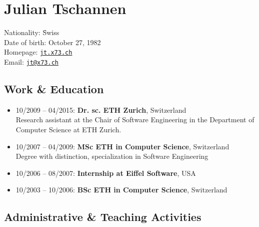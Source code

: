 \chapter*{Julian Tschannen}
\pagestyle{empty}

\vspace{-1cm}

\begin{tabbing}
Nationality: \hspace{1mm} \= Swiss \\
Date of birth: \> October 27, 1982 \\
Homepage:      \> \href{http://jt.x73.ch}{\texttt{jt.x73.ch}} \\
Email:         \> \href{mailto:jt@x73.ch}{\texttt{jt@x73.ch}} \\
\end{tabbing}


\section*{Work \& Education}

\begin{itemize}
  \item
  10/2009 -- 04/2015: \textbf{Dr. sc. ETH Zurich}, Switzerland\\
  Research assistant at the Chair of Software Engineering in the Department of Computer Science at ETH Zurich.

  \item
  10/2007 -- 04/2009: \textbf{MSc ETH in Computer Science}, Switzerland\\
  Degree with distinction, specialization in Software Engineering

  \item
  10/2006 -- 08/2007: \textbf{Internship at Eiffel Software}, USA

  \item
  10/2003 -- 10/2006: \textbf{BSc ETH in Computer Science}, Switzerland

\end{itemize}


\section*{Administrative \& Teaching Activities}

